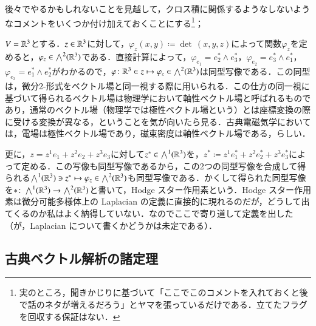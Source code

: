 後々でやるかもしれないことを見越して，クロス積に関係するようなしないようなコメントをいくつか付け加えておくことにする\footnote{実のところ，聞きかじりに基づいて「ここでこのコメントを入れておくと後で話のネタが増えるだろう」とヤマを張っているだけである．立てたフラグを回収する保証はない．}；

\begin{exm}
$V = \mathbb{R}^3$とする．$z \in \mathbb{R}^3$に対して，$\varphi_z(x,y) \coloneqq \det\, (x,y,z)$によって関数$\varphi_z$を定めると，$\varphi_z \in \bigwedge^2(\mathbb{R}^3)$である．直接計算によって，$\varphi_{e_1} = e_2^* \wedge e_3^*$，$\varphi_{e_2} = e_3^* \wedge e_1^*$，$\varphi_{e_3} = e_1^* \wedge e_2^*$がわかるので，$\varphi \colon \mathbb{R}^3 \in z \mapsto \varphi_z \in \bigwedge^2(\mathbb{R}^3)$は同型写像である．この同型は，微分2-形式をベクトル場と同一視する際に用いられる．この仕方の同一視に基づいて得られるベクトル場は物理学において軸性ベクトル場と呼ばれるものであり，通常のベクトル場（物理学では極性ベクトル場という）とは座標変換の際に受ける変換が異なる，ということを気が向いたら見る．古典電磁気学においては，電場は極性ベクトル場であり，磁束密度は軸性ベクトル場である，らしい．
\end{exm}

\begin{exm}
更に，$z = z^1 e_1 + z^2 e_2 + z^3 e_3$に対して$z^* \in \bigwedge^1(\mathbb{R}^3)$を，$z^* \coloneqq z^1 e_1^* + z^2 e_2^* + z^3 e_3^*$によって定める．この写像も同型写像であるから，この2つの同型写像を合成して得られる$\bigwedge^1(\mathbb{R}^3) \ni z^* \mapsto \varphi_z \in \bigwedge^2(\mathbb{R}^3)$も同型写像である．かくして得られた同型写像を$* \colon \bigwedge^1(\mathbb{R}^3) \to \bigwedge^2(\mathbb{R}^3)$と書いて，Hodge スター作用素という．Hodge スター作用素は微分可能多様体上の Laplacian の定義に直接的に現れるのだが，どうして出てくるのか私はよく納得していない．なのでここで寄り道して定義を出した（が，Laplacian について書くかどうかは未定である）．
\end{exm}


\subsection{古典ベクトル解析の諸定理}
